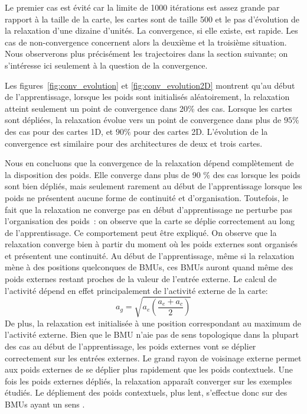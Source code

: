 \documentclass[../main]{subfiles}
\begin{document}
Le premier cas est évité car la limite de 1000 itérations est assez grande par rapport à la taille de la carte, les cartes sont de taille 500 et le pas d'évolution de la relaxation d'une dizaine d'unités. 
La convergence, si elle existe, est rapide. Les cas de non-convergence concernent alors la deuxième et la troisième situation. Nous observerons plus précisément les trajectoires dans la section suivante; on s'intéresse ici seulement à la question de la convergence.

Les figures~\ref{fig:conv_evolution} et \ref{fig:conv_evolution2D} montrent qu'au début de l'apprentissage, lorsque les poids sont initialisés aléatoirement, la relaxation atteint seulement un point de convergence dans 20\% des cas. Lorsque les cartes sont dépliées, la relaxation évolue vers un point de convergence dans plus de $95\%$ des cas pour des cartes 1D, et $90\%$ pour des cartes 2D. L'évolution de la convergence est similaire pour des architectures de deux et trois cartes.

Nous en  concluons que la convergence de la relaxation dépend complètement de la disposition des poids. 
Elle converge dans plus de 90 \% des cas lorsque les poids sont bien dépliés, mais seulement rarement au début de l'apprentissage lorsque les poids ne présentent aucune forme de continuité et d'organisation.
Toutefois, le fait que la relaxation ne converge pas en début d'apprentissage ne perturbe pas l'organisation des poids~: on observe que la carte se déplie correctement au long de l'apprentissage.
Ce comportement peut être expliqué. On observe que la relaxation converge bien à partir du moment où les poids externes sont organisés et présentent une continuité. 
Au début de l'apprentissage, même si la relaxation mène à des positions quelconques de BMUs, ces BMUs auront quand même des poids externes restant proches de la valeur de l'entrée externe. 
Le calcul de l'activité dépend en effet principalement de l'activité externe de la carte:
$$ a_g = \sqrt{a_e \left( \frac{a_e + a_c}{2} \right) }$$ 
De plus, la relaxation est initialisée à une position correspondant au maximum de l'activité externe.
Bien que le BMU n'aie pas de sens topologique dans la plupart des cas au début de l'apprentissage, les poids externes vont se déplier correctement sur les entrées externes. Le grand rayon de voisinage externe permet aux poids externes de se déplier plus rapidement que les poids contextuels. 
Une fois les poids externes dépliés, la relaxation apparaît converger sur les exemples étudiés. Le dépliement des poids contextuels, plus lent, s'effectue donc sur des BMUs ayant un \og sens \fg{}.
\end{document}
